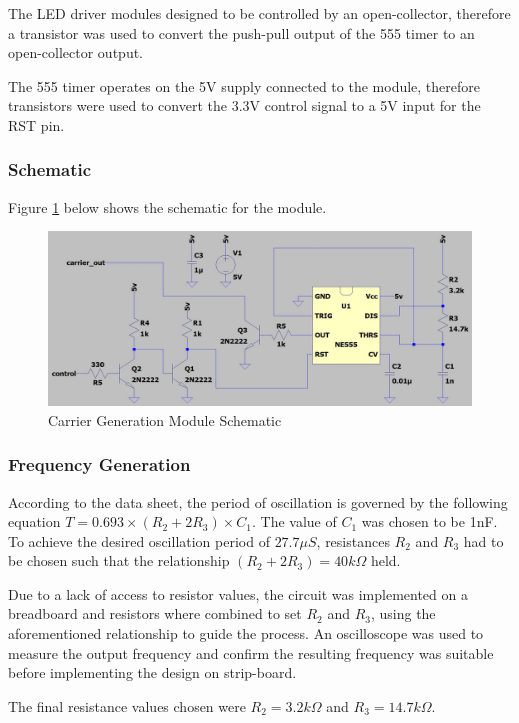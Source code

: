 The LED driver modules designed to be controlled by an open-collector, therefore a transistor was used to convert the push-pull output of the 555 timer to an open-collector output.

The 555 timer operates on the 5V supply connected to the module, therefore transistors were used to convert the 3.3V control signal to a 5V input for the RST pin.

\subsubsection{Schematic}
Figure \ref{fig:schematic_carrier_generation} below shows the schematic for the module.

\begin{figure}[H]
	\centering
	\includegraphics[width=.8\textwidth]{figures/design/carrier_waveform_generator_555.JPG}
	\caption{Carrier Generation Module Schematic}
	\label{fig:schematic_carrier_generation}
\end{figure}

\subsubsection{Frequency Generation}

According to the data sheet, the period of oscillation is governed by the following equation \(T = 0.693\times (R_2 + 2R_3)\times C_1\). The value of $C_1$ was chosen to be 1nF. To achieve the desired oscillation period of $27.7\mu S$, resistances $R_2$ and $R_3$ had to be chosen such that the relationship $(R_2 + 2R_3) = 40k\Omega$ held.

Due to a lack of access to resistor values, the circuit was implemented on a breadboard and resistors where combined to set $R_2$ and $R_3$, using the aforementioned relationship to guide the process. An oscilloscope was used to measure the output frequency and confirm the resulting frequency was suitable before implementing the design on strip-board.

The final resistance values chosen were $R_2 = 3.2k\Omega$ and $R_3 = 14.7k\Omega$.

